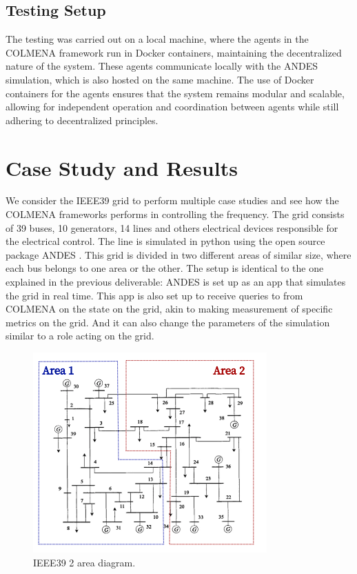 \documentclass{article}
\begin{document}
\subsection*{Testing Setup}

The testing was carried out on a local machine, where the agents in the COLMENA framework run in Docker containers, maintaining the decentralized nature of the system. These agents communicate locally with the ANDES simulation, which is also hosted on the same machine. The use of Docker containers for the agents ensures that the system remains modular and scalable, allowing for independent operation and coordination between agents while still adhering to decentralized principles. 

\section{Case Study and Results}

We consider the IEEE39 \cite{grids:ieee39} grid to perform multiple case studies and see how the COLMENA frameworks performs in controlling the frequency. The grid consists of 39 buses, 10 generators, 14 lines and others electrical devices responsible for the electrical control. The line is simulated in python using the open source package ANDES \cite{grids:models}. This grid is divided in two different areas of similar size, where each bus belongs to one area or the other. The setup is identical to the one explained in the previous deliverable: ANDES is set up as an app that simulates the grid in real time. This app is also set up to receive queries to from COLMENA on the state on the grid, akin to making measurement of specific metrics on the grid. And it can also change the parameters of the simulation similar to a role acting on the grid.

\begin{figure}[ht]
    \centering
    \includegraphics[width=0.8\textwidth]{figures/ieee2areas.png}
    \caption{IEEE39 2 area diagram.}
    \label{fig:ieee39_2areas}
\end{figure}
\end{document}
